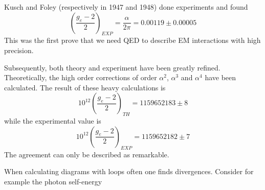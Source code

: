 \documentclass[TheoreticalPhy_ModB.tex]{subfiles}
\begin{document}
\begin{example}
Kusch and Foley (respectively in 1947 and 1948) done experiments and found
\[\left(\frac{g_e-2}2\right)_{EXP}=\frac\alpha{2\pi}=0.00119\pm0.00005\]
This was the first prove that we need QED to describe EM interactions with high precision.

Subsequently, both theory and experiment have been greatly refined. Theoretically, the high order corrections of order $\alpha^2$, $\alpha^3$ and $\alpha^4$ have been calculated. The result of these heavy calculations is
\[10^{12}\left(\frac{g_e-2}2\right)_{TH}=1159652183\pm8\]
while the experimental value is
\[10^{12}\left(\frac{g_e-2}2\right)_{EXP}=1159652182\pm7\]
The agreement can only be described as remarkable. 
\end{example}

When calculating diagrams with loops often one finds divergences. Consider for example the photon self-energy
\end{document}
